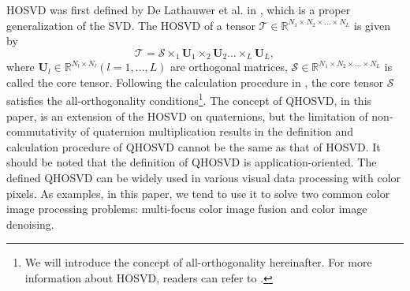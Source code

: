 \documentclass[journal]{IEEEtran}
\begin{document}
HOSVD was first defined by De Lathauwer et al. in \cite{DBLP:journals/siammax/LathauwerMV00}, which is a proper generalization of the SVD. The HOSVD  of  a tensor $\mathcal{T}\in\mathbb{R}^{N_{1}\times N_{2} \times\ldots \times N_{L}}$ is given by 
\begin{equation*}
	\label{hosvd}
	\mathcal{T}=\mathcal{S}\times_{1}\mathbf{U}_{1}\times_{2}\mathbf{U}_{2}\ldots\times_{L}\mathbf{U}_{L},
\end{equation*}
where $\mathbf{U}_{l}\in\mathbb{R}^{N_{l}\times N_{l}} (l=1,\ldots, L)$ are orthogonal matrices, $\mathcal{S}\in\mathbb{R}^{N_{1}\times N_{2} \times\ldots \times N_{L}}$ is called the core tensor. Following the calculation procedure in \cite{DBLP:journals/siammax/LathauwerMV00}, the core tensor $\mathcal{S}$ satisfies the all-orthogonality conditions\footnote{We will introduce the concept of all-orthogonality hereinafter. For more information about HOSVD, readers can refer to \cite{DBLP:journals/siammax/LathauwerMV00}.}. The concept of QHOSVD, in this paper, is an extension of the HOSVD on quaternions, but the limitation of non-commutativity of quaternion multiplication results in the definition and calculation procedure of QHOSVD cannot be the same as that of HOSVD. It should be noted that the definition of QHOSVD is application-oriented. The defined QHOSVD can be widely used in various visual data processing with color pixels. As examples, in this paper, we tend to use it to solve two common color image processing problems: multi-focus color image fusion and color image denoising.
\end{document}
